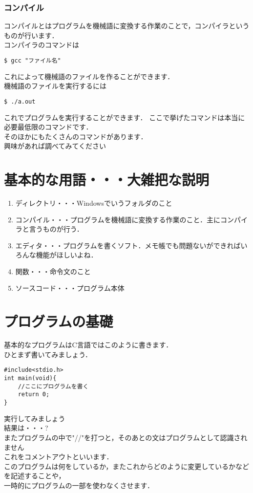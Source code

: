 \documentclass[a4j,titlepage,dvipdfmx]{jsarticle}   %
\begin{document}
\subsubsection{コンパイル}
コンパイルとはプログラムを機械語に変換する作業のことで，コンパイラというものが行います．\\
コンパイラのコマンドは
\begin{lstlisting}
$ gcc "ファイル名"
\end{lstlisting}

これによって機械語のファイルを作ることができます．\\
機械語のファイルを実行するには
\begin{lstlisting}
$ ./a.out
\end{lstlisting}
これでプログラムを実行することができます．
ここで挙げたコマンドは本当に必要最低限のコマンドです．\\
そのほかにもたくさんのコマンドがあります．\\
興味があれば調べてみてください\\
\section{基本的な用語・・・大雑把な説明}
\begin{enumerate}
\item ディレクトリ・・・Windowsでいうフォルダのこと
\item コンパイル・・・プログラムを機械語に変換する作業のこと．主にコンパイラと言うものが行う．
\item エディタ・・・プログラムを書くソフト．メモ帳でも問題ないができればいろんな機能がほしいよね．
\item 関数・・・命令文のこと
\item ソースコード・・・プログラム本体
\end{enumerate}
\section{プログラムの基礎}
基本的なプログラムはC言語ではこのように書きます．\\
ひとまず書いてみましょう．\\
\begin{lstlisting}
#include<stdio.h>
int main(void){
	//ここにプログラムを書く
	return 0;
}
\end{lstlisting}
実行してみましょう\\
結果は・・・?\\
またプログラムの中で"//"を打つと，そのあとの文はプログラムとして認識されません\\
これをコメントアウトといいます．\\
このプログラムは何をしているか，またこれからどのように変更しているかなどを記述することや，\\
一時的にプログラムの一部を使わなくさせます．\\
\end{document}
